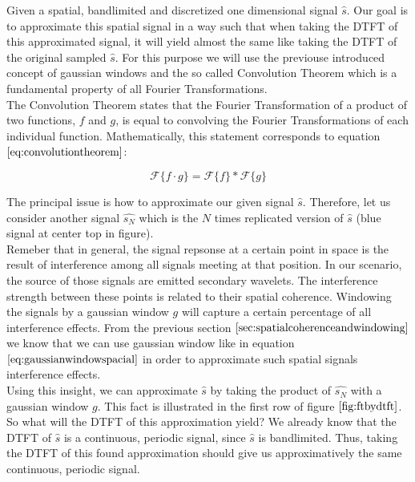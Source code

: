 Given a spatial, bandlimited and discretized one dimensional signal $\hat{s}$. Our goal is to approximate this spatial signal in a way such that when taking the DTFT of this approximated signal, it will yield almost the same like taking the DTFT of the original sampled $\hat{s}$. For this purpose we will use the previouse introduced concept of gaussian windows and the so called Convolution Theorem which is a fundamental property of all Fourier Transformations. \\

The Convolution Theorem states that the Fourier Transformation of a product of two functions, $f$ and $g$, is equal to convolving the Fourier Transformations of each individual function. Mathematically, this statement corresponds to equation $\ref{eq:convolutiontheorem}$:

\begin{equation} 
  \mathcal{F}\{f\cdot g\} = \mathcal{F}\{f\} * \mathcal{F}\{g\}
  \label{eq:convolutiontheorem}
\end{equation}

The principal issue is how to approximate our given signal $\hat{s}$. Therefore, let us consider another signal $\hat{s_N}$ which is the $N$ times replicated version of $\hat{s}$ (blue signal at center top in figure). \\

Remeber that in general, the signal repsonse at a certain point in space is the result of interference among all signals meeting at that position. In our scenario, the source of those signals are emitted secondary wavelets. The interference strength between these points is related to their spatial coherence. Windowing the signals by a gaussian window $g$ will capture a certain percentage of all interference effects. From the previous section $\ref{sec:spatialcoherenceandwindowing}$ we know that we can use gaussian window like in equation $\ref{eq:gaussianwindowspacial}$ in order to approximate such spatial signals interference effects. \\

Using this insight, we can approximate $\hat{s}$ by taking the product of $\hat{s_N}$ with a gaussian window $g$. This fact is illustrated in the first row of figure $\ref{fig:ftbydtft}$. So what will the DTFT of this approximation yield? We already know that the DTFT of $\hat{s}$ is a continuous, periodic signal, since $\hat{s}$ is bandlimited. Thus, taking the DTFT of this found approximation should give us approximatively the same continuous, periodic signal. \\

